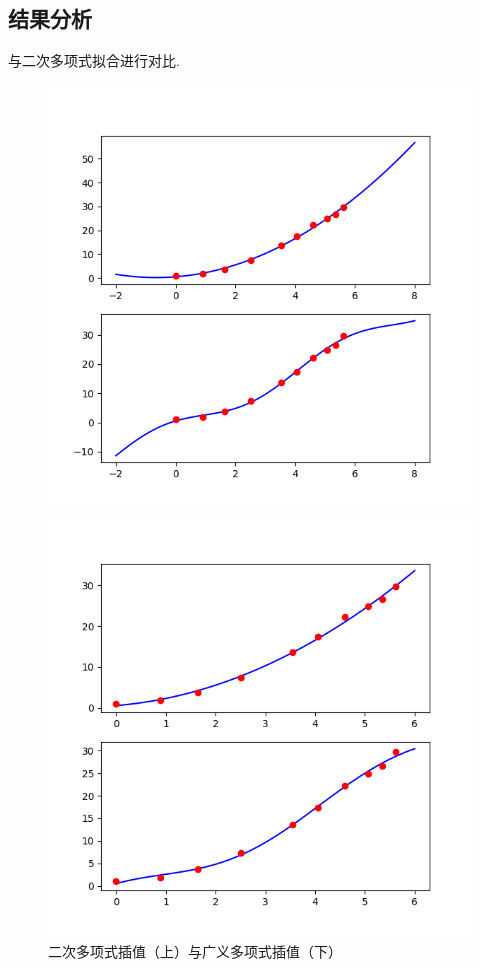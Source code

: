 \documentclass[UTF8,ctexart,a4paper,11pt,openany]{article}
\theoremstyle{definition}
\begin{document}
        \subsection{结果分析}
        与二次多项式拟合进行对比.
        \begin{figure}[H]
                \begin{minipage}{0.5\textwidth}
                    \centering
                    \includegraphics[width=\linewidth]{pics/P7.1.png}
                \end{minipage}%
                \begin{minipage}{0.5\textwidth}
                    \centering
                    \includegraphics[width=\linewidth]{pics/P7.2.png}
                \end{minipage}
            \caption{二次多项式插值（上）与广义多项式插值（下）}
            \end{figure}
\end{document}
